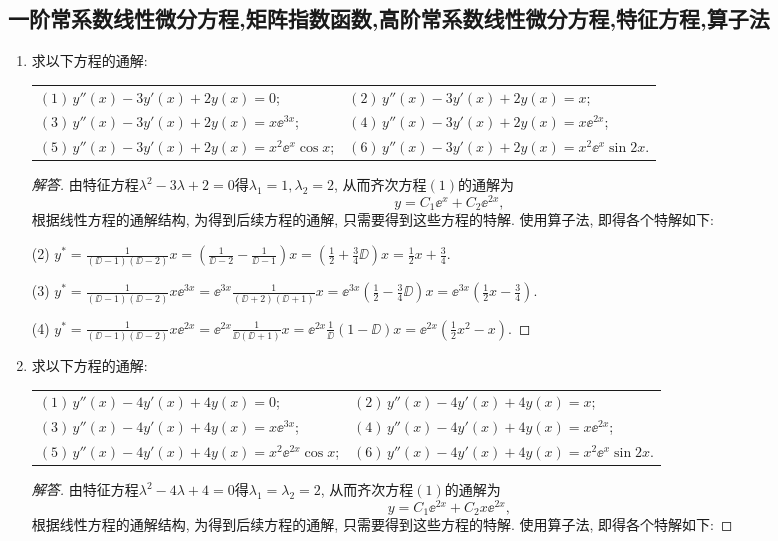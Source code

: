 \subsection{一阶常系数线性微分方程,矩阵指数函数,高阶常系数线性微分方程,特征方程,算子法}
\begin{3a}
\begin{enumerate}
\item 求以下方程的通解:
\begin{center}\begin{tabular}{ll}
\((1)\,y''(x)-3y'(x)+2y(x)=0\);&\((2)\,y''(x)-3y'(x)+2y(x)=x\);\\
\((3)\,y''(x)-3y'(x)+2y(x)=x\ee^{3x}\);&\((4)\,y''(x)-3y'(x)+2y(x)=x\ee^{2x}\);\\
\((5)\,y''(x)-3y'(x)+2y(x)=x^2\ee^{x}\cos x\);&\((6)\,y''(x)-3y'(x)+2y(x)=x^2\ee^{x}\sin 2x\).
\end{tabular}\end{center}
\begin{proof}[解答]
由特征方程\(\lambda^2-3\lambda+2=0\)得\(\lambda_1=1,\lambda_2=2\), 
从而齐次方程\((1)\)的通解为\[y=C_1\ee^x+C_2\ee^{2x},\]
根据线性方程的通解结构, 为得到后续方程的通解, 只需要得到这些方程的特解. 
使用算子法, 即得各个特解如下:

(2) \(y^*=\frac{1}{(\DD-1)(\DD-2)}x
=\left(\frac{1}{\DD-2}-\frac{1}{\DD-1}\right)x
=\left(\frac{1}{2}+\frac{3}{4}\DD\right)x=\frac{1}{2}x+\frac{3}{4}.\)

(3) \(y^*=\frac{1}{(\DD-1)(\DD-2)}x\ee^{3x}=\ee^{3x}\frac{1}{(\DD+2)(\DD+1)}x
=\ee^{3x}\left(\frac{1}{2}-\frac{3}{4}\DD\right)x
=\ee^{3x}\left(\frac{1}{2}x-\frac{3}{4}\right).\)

(4) \(y^*=\frac{1}{(\DD-1)(\DD-2)}x\ee^{2x}=\ee^{2x}\frac{1}{\DD(\DD+1)}x=\ee^{2x}\frac{1}{\DD}\left(1-\DD\right)x=\ee^{2x}\left(\frac{1}{2}x^2-x\right).\)
\end{proof}

\item 求以下方程的通解:
\begin{center}\begin{tabular}{ll}
\((1)\,y''(x)-4y'(x)+4y(x)=0\);&\((2)\,y''(x)-4y'(x)+4y(x)=x\);\\
\((3)\,y''(x)-4y'(x)+4y(x)=x\ee^{3x}\);&\((4)\,y''(x)-4y'(x)+4y(x)=x\ee^{2x}\);\\
\((5)\,y''(x)-4y'(x)+4y(x)=x^2\ee^{2x}\cos x\);&\((6)\,y''(x)-4y'(x)+4y(x)=x^2\ee^{x}\sin 2x\).
\end{tabular}\end{center}
\begin{proof}[解答]
由特征方程\(\lambda^2-4\lambda+4=0\)得\(\lambda_1=\lambda_2=2\), 
从而齐次方程\((1)\)的通解为\[y=C_1\ee^{2x}+C_2x\ee^{2x},\]
根据线性方程的通解结构, 为得到后续方程的通解, 只需要得到这些方程的特解. 
使用算子法, 即得各个特解如下:


\end{proof}
\end{enumerate}
\end{3a}
